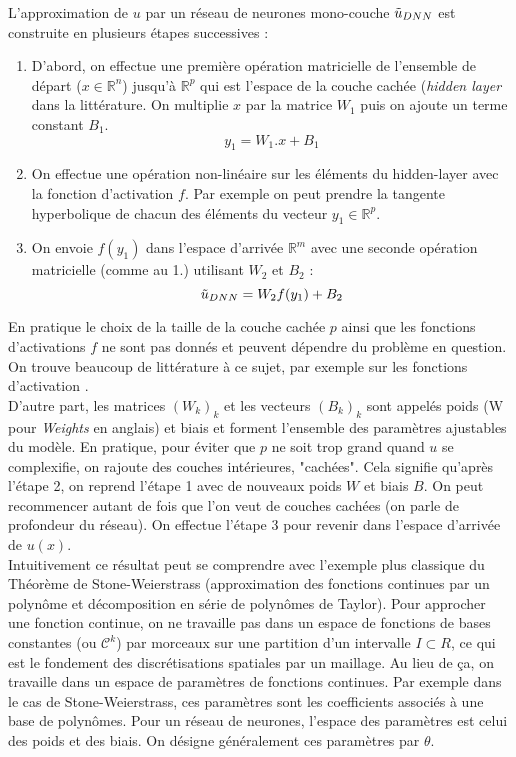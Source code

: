 L'approximation de $u$ par un réseau de neurones mono-couche $\Tilde{u}_{DNN}$ est construite en plusieurs étapes successives : 
\begin{enumerate}
    \item D'abord, on effectue une première opération matricielle de l'ensemble de départ ($x\in \mathbb{R}^n$) jusqu'à $\mathbb{R}^p$ qui est l'espace de la couche cachée (\textit{hidden layer} dans la littérature. On multiplie $x$ par la matrice $W_1$ puis on ajoute un terme constant $B_1$. 
    $$ y_1 = W_1 . x + B_1 $$
    \item On effectue une opération non-linéaire sur les éléments du hidden-layer avec la fonction d'activation $f$. Par exemple on peut prendre la tangente hyperbolique de chacun des éléments du vecteur $y_1 \in \mathbb{R}^p$.
    \item On envoie $f(y_1)$ dans l'espace d'arrivée $\mathbb{R}^m$ avec une seconde opération matricielle (comme au 1.) utilisant $W_2$ et $B_2$ :
    $$ \Tilde{u}_{DNN} = W_2 f(y_1) + B_2 $$
\end{enumerate}
En pratique le choix de la taille de la couche cachée $p$ ainsi que les fonctions d'activations $f$ ne sont pas donnés et peuvent dépendre du problème en question. On trouve beaucoup de littérature à ce sujet, par exemple sur les fonctions d'activation \cite{leshnoMultilayerFeedforwardNetworks1993}.\\

D'autre part, les matrices $(W_k)_k$ et les vecteurs $(B_k)_k$ sont appelés poids (W pour \textit{Weights} en anglais) et biais et forment l'ensemble des paramètres ajustables du modèle. En pratique, pour éviter que $p$ ne soit trop grand quand $u$ se complexifie, on rajoute des couches intérieures, "cachées". Cela signifie qu'après l'étape 2, on reprend l'étape 1 avec de nouveaux poids $W$ et biais $B$. On peut recommencer autant de fois que l'on veut de couches cachées (on parle de profondeur du réseau). On effectue l'étape 3 pour revenir dans l'espace d'arrivée de $u(x)$. \\

Intuitivement ce résultat peut se comprendre avec l'exemple plus classique du Théorème de Stone-Weierstrass (approximation des fonctions continues par un polynôme et décomposition en série de polynômes de Taylor). Pour approcher une fonction continue, on ne travaille pas dans un espace de fonctions de bases constantes (ou $\mathcal{C}^k$) par morceaux sur une partition d'un intervalle  $I \subset R$, ce qui est le fondement des discrétisations spatiales par un maillage. Au lieu de ça, on travaille dans un espace de paramètres de fonctions continues. Par exemple dans le cas de Stone-Weierstrass, ces paramètres sont les coefficients associés à une base de polynômes. Pour un réseau de neurones, l'espace des paramètres est celui des poids et des biais. On désigne généralement ces paramètres par $\theta$.\\

